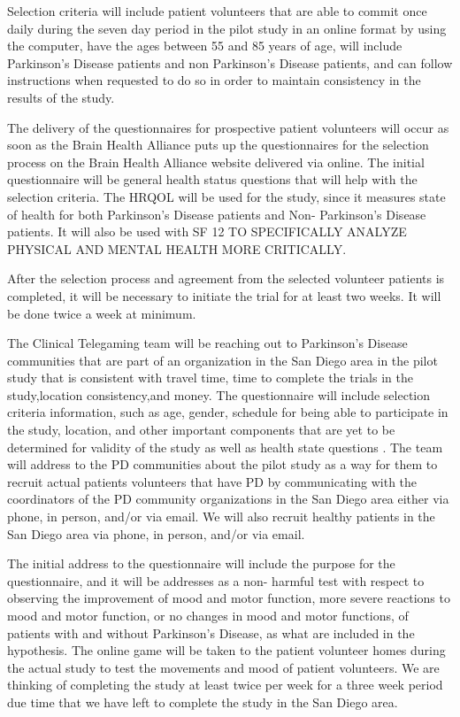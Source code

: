 \documentclass[12pt,letterpaper]{article}
\begin{document}
 Selection criteria will include patient volunteers that are able to commit once daily during the seven day period in the pilot study in an online format by using the computer, have the ages between 55 and 85 years of age, will include Parkinson's Disease patients and non Parkinson's Disease patients, and can follow instructions when requested to do so in order to maintain consistency in the results of the study. 
  
 The delivery of the questionnaires for prospective patient volunteers will occur as soon as the Brain Health Alliance puts up the questionnaires for the selection process on the Brain Health Alliance website delivered via online. The initial questionnaire will be general health status questions that will help with the selection criteria. The HRQOL will be used for the study, since it measures state of health for both Parkinson's Disease patients and Non- Parkinson's Disease patients. It will also be used with SF 12 TO SPECIFICALLY ANALYZE PHYSICAL AND MENTAL HEALTH MORE CRITICALLY. 

 After the selection process and agreement from the selected volunteer patients is completed, it will be necessary to initiate the trial for at least two weeks. It will be done twice a week at minimum.
 
 The Clinical Telegaming team will be reaching out to Parkinson's Disease communities that are part of an organization in the San Diego area in the pilot study that is consistent with travel time, time to complete
 the trials in the study,location consistency,and money. The questionnaire will include selection criteria information, such as age, gender, schedule for being able to participate in the study, location, and other important components that are yet to be determined for validity of the study as well as health state questions \cite{Jenkinson2011}. The team will address to the PD communities about the pilot study as a way for them to recruit actual patients volunteers that have PD by communicating with the coordinators of the PD community organizations in the San Diego area either via phone, in person, and/or via email. We will also recruit healthy patients in the San Diego area via phone, in person, and/or via email. 
 
 The initial address to the questionnaire will include the purpose for the questionnaire, and it will be addresses as a non- harmful test with respect to observing the improvement of mood and motor function, more severe reactions to mood and motor function, or no changes in mood and motor functions, of patients with and without Parkinson's Disease, as what are included in the hypothesis. The online game
 will be taken to the patient volunteer homes during the actual study to test the movements and mood of patient volunteers. We are thinking of completing the study at least twice per week for a three week period due time that we have left to complete the study in the San Diego area. 
 
\end{document}
